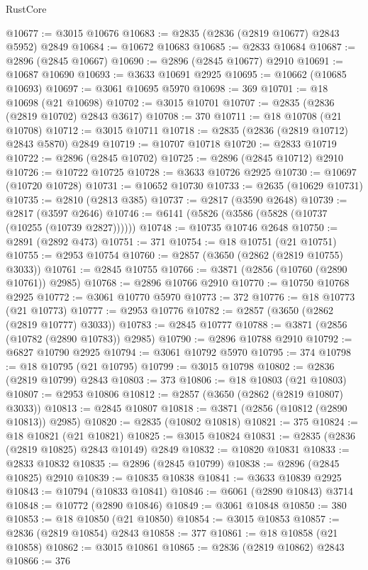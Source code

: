 \begin{lexlean}{RustCore}
\begin{coremodule}
@10677 := @3015 @10676
@10683 := @2835 (@2836 (@2819 @10677) @2843 @5952) @2849
@10684 := @10672 @10683
@10685 := @2833 @10684
@10687 := @2896 (@2845 @10667)
@10690 := @2896 (@2845 @10677) @2910
@10691 := @10687 @10690
@10693 := @3633 @10691 @2925
@10695 := @10662 (@10685 @10693)
@10697 := @3061 @10695 @5970
@10698 := 369
@10701 := @18 @10698 (@21 @10698)
@10702 := @3015 @10701
@10707 := @2835 (@2836 (@2819 @10702) @2843 @3617)
@10708 := 370
@10711 := @18 @10708 (@21 @10708)
@10712 := @3015 @10711
@10718 := @2835 (@2836 (@2819 @10712) @2843 @5870) @2849
@10719 := @10707 @10718
@10720 := @2833 @10719
@10722 := @2896 (@2845 @10702)
@10725 := @2896 (@2845 @10712) @2910
@10726 := @10722 @10725
@10728 := @3633 @10726 @2925
@10730 := @10697 (@10720 @10728)
@10731 := @10652 @10730
@10733 := @2635 (@10629 @10731)
@10735 := @2810 (@2813 @385)
@10737 := @2817 (@3590 @2648)
@10739 := @2817 (@3597 @2646)
@10746 := @6141 (@5826 (@3586 (@5828 (@10737 (@10255 (@10739 @2827))))))
@10748 := @10735 @10746 @2648
@10750 := @2891 (@2892 @473)
@10751 := 371
@10754 := @18 @10751 (@21 @10751)
@10755 := @2953 @10754
@10760 := @2857 (@3650 (@2862 (@2819 @10755) @3033))
@10761 := @2845 @10755
@10766 := @3871 (@2856 (@10760 (@2890 @10761)) @2985)
@10768 := @2896 @10766 @2910
@10770 := @10750 @10768 @2925
@10772 := @3061 @10770 @5970
@10773 := 372
@10776 := @18 @10773 (@21 @10773)
@10777 := @2953 @10776
@10782 := @2857 (@3650 (@2862 (@2819 @10777) @3033))
@10783 := @2845 @10777
@10788 := @3871 (@2856 (@10782 (@2890 @10783)) @2985)
@10790 := @2896 @10788 @2910
@10792 := @6827 @10790 @2925
@10794 := @3061 @10792 @5970
@10795 := 374
@10798 := @18 @10795 (@21 @10795)
@10799 := @3015 @10798
@10802 := @2836 (@2819 @10799) @2843
@10803 := 373
@10806 := @18 @10803 (@21 @10803)
@10807 := @2953 @10806
@10812 := @2857 (@3650 (@2862 (@2819 @10807) @3033))
@10813 := @2845 @10807
@10818 := @3871 (@2856 (@10812 (@2890 @10813)) @2985)
@10820 := @2835 (@10802 @10818)
@10821 := 375
@10824 := @18 @10821 (@21 @10821)
@10825 := @3015 @10824
@10831 := @2835 (@2836 (@2819 @10825) @2843 @10149) @2849
@10832 := @10820 @10831
@10833 := @2833 @10832
@10835 := @2896 (@2845 @10799)
@10838 := @2896 (@2845 @10825) @2910
@10839 := @10835 @10838
@10841 := @3633 @10839 @2925
@10843 := @10794 (@10833 @10841)
@10846 := @6061 (@2890 @10843) @3714
@10848 := @10772 (@2890 @10846)
@10849 := @3061 @10848
@10850 := 380
@10853 := @18 @10850 (@21 @10850)
@10854 := @3015 @10853
@10857 := @2836 (@2819 @10854) @2843
@10858 := 377
@10861 := @18 @10858 (@21 @10858)
@10862 := @3015 @10861
@10865 := @2836 (@2819 @10862) @2843
@10866 := 376

\end{coremodule}
\end{lexlean}
